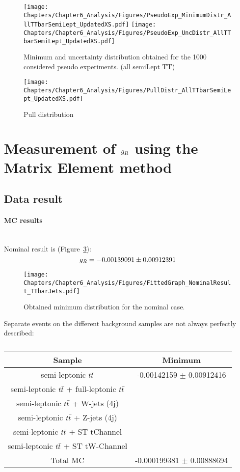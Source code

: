 \begin{figure}[h!t]
 \centering
 \texttt{[image: Chapters/Chapter6\_Analysis/Figures/PseudoExp\_MinimumDistr\_AllTTbarSemiLept\_UpdatedXS.pdf]}
 \texttt{[image: Chapters/Chapter6\_Analysis/Figures/PseudoExp\_UncDistr\_AllTTbarSemiLept\_UpdatedXS.pdf]}
 \caption{Minimum and uncertainty distribution obtained for the 1000 considered pseudo experiments. (all semiLept TT)}  \label{fig::MinAndUnc}
\end{figure}

\begin{figure}[h!t]
 \centering
 \texttt{[image: Chapters/Chapter6\_Analysis/Figures/PullDistr\_AllTTbarSemiLept\_UpdatedXS.pdf]}
 \caption{Pull distribution} \label{fig::PullDistr}
\end{figure}

\section{Measurement of $g_{R}$ using the Matrix Element method} \label{sec::gRMeas}

\subsection{Data result}
\paragraph{MC results } \hfill \\

Nominal result is (Figure~\ref{fig::MinNominal}):
\begin{equation}
 g_{R} = -0.00139091 \pm 0.00912391
\end{equation}

\begin{figure}[h!t]
 \centering
 \texttt{[image: Chapters/Chapter6\_Analysis/Figures/FittedGraph\_NominalResult\_TTbarJets.pdf]}
 \caption{Obtained minimum distribution for the nominal case.} \label{fig::MinNominal}
\end{figure}

Separate events on the different background samples are not always perfectly described:
\begin{table}[h!t]
 \centering
 \caption{} \label{table::BckInfl}
 \renewcommand{\arraystretch}{1.2}
 \begin{tabular}{c|c}
  Sample 						& Minimum 			\\
  \hline
  semi-leptonic $t\bar{t}$ 				& -0.00142159 $\pm$ 0.00912416 	\\
  semi-leptonic $t\bar{t}$ + full-leptonic $t\bar{t}$ 	&  	\\
  semi-leptonic $t\bar{t}$ + W-jets (4j) 			&  	\\
  semi-leptonic $t\bar{t}$ + Z-jets (4j) 			&  		\\
  semi-leptonic $t\bar{t}$ + ST tChannel 			&  	\\
  semi-leptonic $t\bar{t}$ + ST tW-Channel  		&  	\\
  \hline
  Total MC 			& -0.000199381 $\pm$ 0.00888694 
 \end{tabular}
\end{table}

